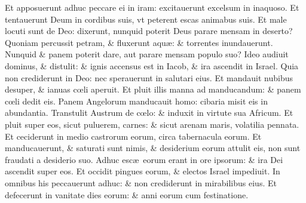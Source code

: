 \documentclass[a5paper,10pt]{book}
\def\ae{æ}
\def\oe{œ}
\begin{document}
\begin{multicols*}{2}
\newline \color{red} E\color{black}t apposuerunt adhuc peccare ei in iram: excitauerunt excelsum in inaquoso.
\newline \color{red} E\color{black}t tentauerunt Deum in cordibus suis, vt peterent escas animabus suis.
\newline \color{red} E\color{black}t male locuti sunt de Deo: dixerunt, nunquid poterit Deus parare mensam in deserto?
\newline \color{red} Q\color{black}uoniam percussit petram, \& fluxerunt aqu\ae : \& torrentes inundauerunt.
\newline \color{red} N\color{black}unquid \& panem poterit dare, aut parare mensam populo suo?
\newline \color{red} I\color{black}deo audiuit dominus, \& distulit: \& ignis accensus est in Iacob, \& ira ascendit in Israel.
\newline \color{red} Q\color{black}uia non crediderunt in Deo: nec sperauerunt in salutari eius.
\newline \color{red} E\color{black}t mandauit nubibus desuper, \& ianuas c\oe li aperuit.
\newline \color{red} E\color{black}t pluit illis manna ad manducandum: \& panem c\oe li dedit eis.
\newline \color{red} P\color{black}anem Angelorum manducauit homo: cibaria misit eis in abundantia.
\newline \color{red} T\color{black}ranstulit Austrum de c\oe lo: \& induxit in virtute sua Africum.
\newline \color{red} E\color{black}t pluit super eos, sicut puluerem, carnes: \& sicut arenam maris, volatilia pennata.
\newline \color{red} E\color{black}t ceciderunt in medio castrorum eorum, circa tabernacula eorum.
\newline \color{red} E\color{black}t manducauerunt, \& saturati sunt nimis, \& desiderium eorum attulit eis, non sunt fraudati a desiderio suo.
\newline \color{red} A\color{black}dhuc esc\ae \ eorum erant in ore ipsorum: \& ira Dei ascendit super eos.
\newline \color{red} E\color{black}t occidit pingues eorum, \& electos Israel impediuit.
\newline \color{red} I\color{black}n omnibus his peccauerunt adhuc: \& non crediderunt in mirabilibus eius.
\newline \color{red} E\color{black}t defecerunt in vanitate dies eorum: \& anni eorum cum festinatione.

\end{multicols*}
\end{document}
